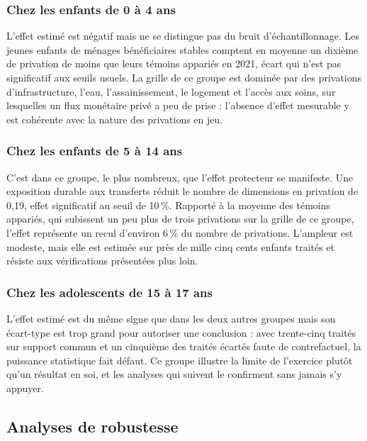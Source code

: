 \subsubsection{Chez les enfants de 0 à 4 ans}

L'effet estimé est négatif mais ne se distingue pas du bruit
d'échantillonnage. Les jeunes enfants de ménages bénéficiaires stables
comptent en moyenne un dixième de privation de moins que leurs témoins
appariés en 2021, écart qui n'est pas significatif aux seuils usuels. La
grille de ce groupe est dominée par des privations d'infrastructure, l'eau,
l'assainissement, le logement et l'accès aux soins, sur lesquelles un flux
monétaire privé a peu de prise : l'absence d'effet mesurable y est
cohérente avec la nature des privations en jeu.

\subsubsection{Chez les enfants de 5 à 14 ans}

C'est dans ce groupe, le plus nombreux, que l'effet protecteur se
manifeste. Une exposition durable aux transferts réduit le nombre de
dimensions en privation de 0,19, effet significatif au seuil de 10\,\%.
Rapporté à la moyenne des témoins appariés, qui subissent un peu plus de
trois privations sur la grille de ce groupe, l'effet représente un recul
d'environ 6\,\% du nombre de privations. L'ampleur est modeste, mais elle
est estimée sur près de mille cinq cents enfants traités et résiste aux
vérifications présentées plus loin.

\subsubsection{Chez les adolescents de 15 à 17 ans}

L'effet estimé est du même signe que dans les deux autres groupes mais
son écart-type est trop grand pour autoriser une conclusion : avec
trente-cinq traités sur support commun et un cinquième des traités
écartés faute de contrefactuel, la puissance statistique fait défaut. Ce
groupe illustre la limite de l'exercice plutôt qu'un résultat en soi, et
les analyses qui suivent le confirment sans jamais s'y appuyer.

\subsection{Analyses de robustesse}

